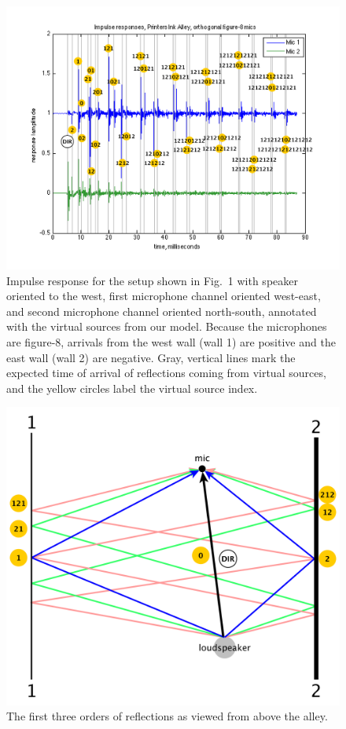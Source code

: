 \documentclass{aes137}
\begin{document}
\begin{figure}[h!] \centering \includegraphics[width=\linewidth]{images/annotated_reflections_v2.pdf} 
\caption{Impulse response for the setup shown in Fig.~1 with speaker
  oriented to the west, first microphone channel oriented west-east, and second microphone channel oriented north-south, annotated with the virtual sources from our
  model. Because the microphones are figure-8, arrivals from the west wall (wall 1) are positive
and the east wall (wall 2) are negative. Gray, vertical lines mark the expected time of arrival of
  reflections coming from virtual sources, and the yellow circles
  label the virtual source index.} %
\end{figure}

\begin{figure}[h!] \centering \includegraphics[width=0.7\linewidth]{images/planview_paths_v2.pdf} 
\caption{The first three orders of reflections as viewed from above the alley.} 
\end{figure}
\end{document}
